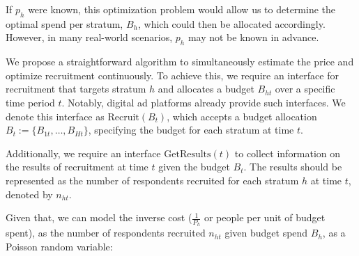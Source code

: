 \documentclass[letterpaper,12pt]{article}
\theoremstyle{proposition}
\begin{document}

If $p_h$  were known, this optimization problem would allow us to determine the optimal spend per stratum, $B_h$, which could then be allocated accordingly. However, in many real-world scenarios, $p_h$ may not be known in advance.
  
We propose a straightforward algorithm to simultaneously estimate the price and optimize recruitment continuously. To achieve this, we require an interface for recruitment that targets stratum \( h \) and allocates a budget \( B_{ht} \) over a specific time period \( t \). Notably, digital ad platforms already provide such interfaces. We denote this interface as \(\text{Recruit}(B_t)\), which accepts a budget allocation \( B_t := \{B_{1t}, \ldots, B_{Ht}\} \), specifying the budget for each stratum at time \( t \).

Additionally, we require an interface \(\text{GetResults}(t)\) to collect information on the results of recruitment at time \( t \) given the budget \( B_t \). The results should be represented as the number of respondents recruited for each stratum \( h \) at time \( t \), denoted by \( n_{ht} \).


Given that, we can model the inverse cost ($\frac{1}{P_h}$ or people per unit of budget spent),  as the number of respondents recruited $n_{ht}$ given budget spend $B_h$, as a Poisson random variable:
\end{document}
